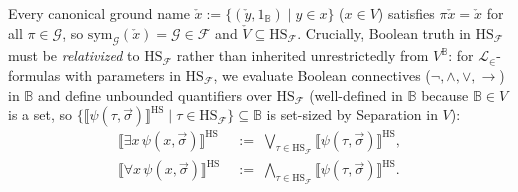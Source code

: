 Every canonical ground name $\check{x} := \{(\check{y}, 1_{\mathbb{B}}) \mid y \in x\}$ ($x \in V$) satisfies $\pi\check{x} = \check{x}$ for all $\pi \in \mathcal{G}$, so $\mathrm{sym}_{\mathcal{G}}(\check{x}) = \mathcal{G} \in \mathcal{F}$ and $\check{V} \subseteq \mathrm{HS}_{\mathcal{F}}$. Crucially, Boolean truth in $\mathrm{HS}_{\mathcal{F}}$ must be \emph{relativized} to $\mathrm{HS}_{\mathcal{F}}$ rather than inherited unrestrictedly from $V^{\mathbb{B}}$: for $\mathcal{L}_\in$-formulas with parameters in $\mathrm{HS}_{\mathcal{F}}$, we evaluate Boolean connectives ($\neg, \wedge, \vee, \to$) in $\mathbb{B}$ and define unbounded quantifiers over $\mathrm{HS}_{\mathcal{F}}$ (well-defined in $\mathbb{B}$ because $\mathbb{B} \in V$ is a set, so $\{\llbracket \psi(\tau, \vec{\sigma}) \rrbracket^{\mathrm{HS}} \mid \tau \in \mathrm{HS}_{\mathcal{F}}\} \subseteq \mathbb{B}$ is set-sized by Separation in $V$):
\[
  \begin{aligned}
    \llbracket \exists x\,\psi(x, \vec{\sigma}) \rrbracket^{\mathrm{HS}} &\;:=\; \bigvee_{\tau \in \mathrm{HS}_{\mathcal{F}}} \llbracket \psi(\tau, \vec{\sigma}) \rrbracket^{\mathrm{HS}}, \\
    \llbracket \forall x\,\psi(x, \vec{\sigma}) \rrbracket^{\mathrm{HS}} &\;:=\; \bigwedge_{\tau \in \mathrm{HS}_{\mathcal{F}}} \llbracket \psi(\tau, \vec{\sigma}) \rrbracket^{\mathrm{HS}}.
  \end{aligned}
\]

